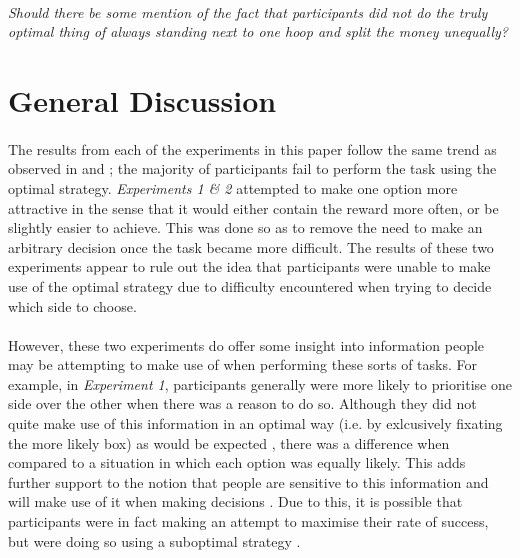 \documentclass[12pt]{article}
\begin{document}
\paragraph{} \textit{Should there be some mention of the fact that participants did not do the truly optimal thing of always standing next to one hoop and split the money unequally?} 

\section*{General Discussion}
\paragraph{} The results from each of the experiments in this paper follow the same trend as observed in \cite{clarke2015failure} and \cite{James2017}; the majority of participants fail to perform the task using the optimal strategy. \textit{Experiments 1 \& 2} attempted to make one option more attractive in the sense that it would either contain the reward more often, or be slightly easier to achieve. This was done so as to remove the need to make an arbitrary decision once the task became more difficult. The results of these two experiments appear to rule out the idea that participants were unable to make use of the optimal strategy due to difficulty encountered when trying to decide which side to choose. 

\paragraph{} However, these two experiments do offer some insight into information people may be attempting to make use of when performing these sorts of tasks. For example, in \textit{Experiment 1}, participants generally were more likely to prioritise one side over the other when there was a reason to do so. Although they did not quite make use of this information in an optimal way (i.e. by exlcusively fixating the more likely box) as would be expected \citep{koehler2014probability}, there was a difference when compared to a situation in which each option was equally likely. This adds further support to the notion that people are sensitive to this information and will make use of it when making decisions \citep{wolford2004searching,yellott1969probability}. Due to this, it is possible that participants were in fact making an attempt to maximise their rate of success, but were doing so using a suboptimal strategy \citep{Gao2015}.  
\end{document}

